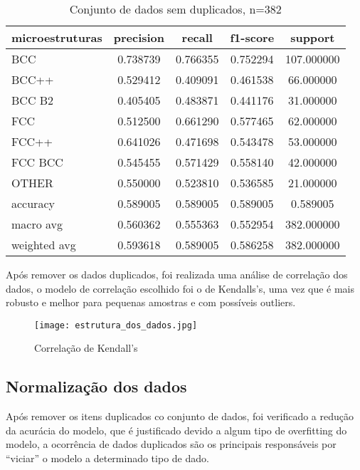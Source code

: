 \begin{table}[htb]
\centering
\caption{Conjunto de dados sem duplicados, n=382}
\begin{supertabular}{l|c|c|c|c}
\hline
{ microestruturas } & { precision } & { recall } & { f1-score } & { support }\\\hline
{ BCC } &           {0.738739} & {0.766355} & {0.752294} & {107.000000}\\\hline
{ BCC++ } &        {0.529412} & {0.409091} & {0.461538} & {66.000000}\\\hline
{ BCC B2 } &        {0.405405} & {0.483871} & {0.441176} & {31.000000}\\\hline
{ FCC } &           {0.512500} & {0.661290} & {0.577465} & {62.000000}\\\hline
{ FCC++ } &        {0.641026} & {0.471698} & {0.543478} & {53.000000}\\\hline
{ FCC BCC } &       {0.545455} & {0.571429} & {0.558140} & {42.000000}\\\hline
{ OTHER } &         {0.550000} & {0.523810} & {0.536585} & {21.000000}\\\hline
{ accuracy } &      {0.589005} & {0.589005} & {0.589005} & {0.589005}\\\hline
{ macro avg } &     {0.560362} & {0.555363} & {0.552954} & {382.000000}\\\hline
{ weighted avg } &  {0.593618} & {0.589005} & {0.586258} & {382.000000}\\\hline
\end{supertabular}
    \legend{}
    \label{table:relatorio_sem_duplicados}
\end{table}


Após remover os dados duplicados, foi realizada uma análise de correlação dos dados, o modelo de correlação escolhido foi o de Kendalls's, uma vez que é mais robusto e melhor para pequenas amostras e com possíveis outliers.

\begin{figure}[ht]
    \centering
    \texttt{[image: estrutura\_dos\_dados.jpg]} 
    \caption{Correlação de Kendall's }
    \label{fig:kendals_correlacao_sem_duplicados}
\end{figure}
\FloatBarrier


\subsection{Normalização dos dados}\label{sec:MAT_MET_SEC_B_SUB_D}

Após remover os itens duplicados co conjunto de dados, foi verificado a redução da acurácia do modelo, que é justificado devido a algum tipo de overfitting do modelo, a ocorrência de dados duplicados são os principais responsáveis por ``viciar'' o modelo a determinado tipo de dado.

